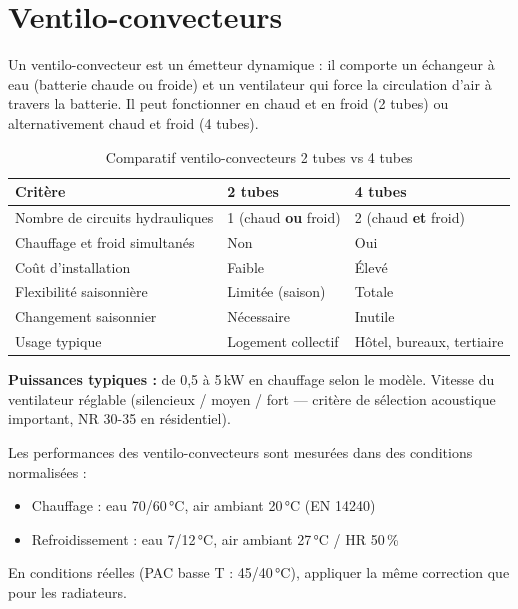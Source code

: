 \section{Ventilo-convecteurs}

\begin{definition}[title=Ventilo-convecteur (fan-coil)]
Un ventilo-convecteur est un émetteur dynamique : il comporte un échangeur à eau (batterie chaude ou froide) et un ventilateur qui force la circulation d'air à travers la batterie. Il peut fonctionner en chaud et en froid (2 tubes) ou alternativement chaud et froid (4 tubes).
\end{definition}

\begin{table}[H]
  \centering
  \caption{Comparatif ventilo-convecteurs 2 tubes vs 4 tubes}
  \begin{tabular}{lll}
    \toprule
    Critère & 2 tubes & 4 tubes \\
    \midrule
    Nombre de circuits hydrauliques & 1 (chaud \textbf{ou} froid) & 2 (chaud \textbf{et} froid) \\
    Chauffage et froid simultanés & Non & Oui \\
    Coût d'installation & Faible & Élevé \\
    Flexibilité saisonnière & Limitée (saison) & Totale \\
    Changement saisonnier & Nécessaire & Inutile \\
    Usage typique & Logement collectif & Hôtel, bureaux, tertiaire \\
    \bottomrule
  \end{tabular}
\end{table}

\textbf{Puissances typiques :} de 0,5 à 5\,kW en chauffage selon le modèle. Vitesse du ventilateur réglable (silencieux / moyen / fort — critère de sélection acoustique important, NR 30-35 en résidentiel).

\begin{definition}[title=Conditions normalisées de puissance VEC (NF EN 14240)]
Les performances des ventilo-convecteurs sont mesurées dans des conditions normalisées :
\begin{itemize}
  \item Chauffage : eau 70/60\,°C, air ambiant 20\,°C (EN 14240)
  \item Refroidissement : eau 7/12\,°C, air ambiant 27\,°C / HR 50\,\%
\end{itemize}
En conditions réelles (PAC basse T : 45/40\,°C), appliquer la même correction que pour les radiateurs.
\end{definition}

